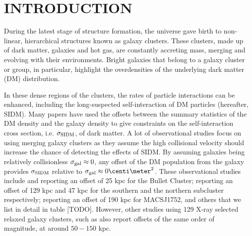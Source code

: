 

\section{INTRODUCTION} 
During the latest stage of structure formation, the universe gave birth to
non-linear, hierarchical structures known as galaxy clusters. 
These clusters, made up of dark matter, galaxies and hot gas,
are constantly accreting mass, merging and evolving with their
environments. Bright galaxies that belong to a galaxy cluster or group, in 
particular, highlight the overdensities of the underlying dark matter (DM) 
distribution. 


In these dense regions of the clusters, the rates of particle
interactions can be enhanced, including the long-suspected self-interaction of DM
particles (hereafter, SIDM).  
Many papers have used the offsets between the summary statistics of the DM
density and the galaxy density to give constraints on 
the self-interaction cross
section, i.e. $\sigma_{\rm SIDM}$, of dark matter. 
A lot of observational studies focus on using merging galaxy clusters
as they assume the high collisional velocity should increase the chance
of detecting the effects of SIDM.
By assuming galaxies being relatively collisionless $\sigma_{\rm gal} \approx 0$, 
any offset of the DM population from the galaxy provides $\sigma_{\rm SIDM}$ 
relative to $\sigma_{\rm gal} \approx 0 \centi\meter^2$. 
These observational studies include \cite{Markevitch2004} and \cite{Bradac2006b}  
reporting an offset of 25 kpc for the Bullet Cluster;  
\cite{Dawson2013} reporting an offset of 129 kpc and 47 kpc for the southern
and the northern subcluster respectively;
\cite{Jee2015} reporting an offset of 190 kpc for MACSJ1752, and others that we
list in detail in table [TODO].
However, other studies using 129 X-ray selected relaxed galaxy clusters, 
such as \cite{George2012a} also report offsets of the same order of magnitude,
at around $50 - 150$ kpc. 

